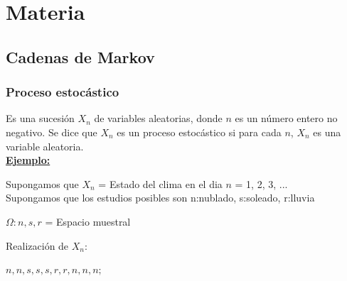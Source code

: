 \documentclass{templateNote}
\begin{document}

\portada
\margenes
\tableofcontents
\newpage




\section{Materia}

\subsection{Cadenas de Markov}
\subsubsection{Proceso estocástico}
\noindent Es una sucesión $X_n$ de variables aleatorias, donde $n$ es un número entero no negativo. Se dice que $X_n$ es un proceso estocástico si para cada $n$, $X_n$ es una variable aleatoria.\\

\noindent\underline{\textbf{Ejemplo:}}

\noindent Supongamos que $X_n$ = Estado del clima en el dia $n$ = 1, 2, 3, ...\\ Supongamos que los estudios posibles son {n:nublado, s:soleado, r:lluvia}\\
\begin{center}
    $\Omega: {n,s,r}$ = Espacio muestral\\    
\end{center}

\noindent Realización de $X_n$:
\begin{center}
    $n,n,s,s,s,r,r,n,n,n;$
\end{center}
\end{document}
